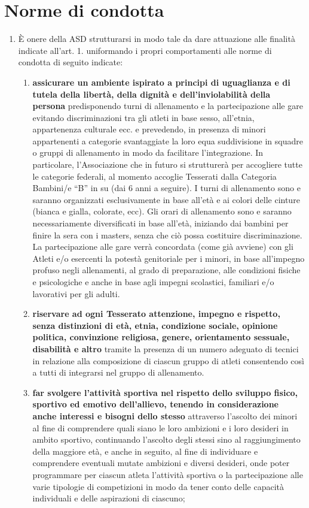 \documentclass{djtsdoc}
\begin{document}
	\section{Norme di condotta}
	\begin{enumerate}
		\item È onere della ASD strutturarsi in modo tale da dare attuazione alle finalità indicate all'art. 1. uniformando i propri comportamenti alle norme di condotta di seguito indicate:
		\begin{enumerate}
			\item \textbf{assicurare un ambiente ispirato a principi di uguaglianza e di tutela della libertà, della dignità e dell'inviolabilità della persona} predisponendo turni di allenamento e la partecipazione alle gare evitando discriminazioni tra gli atleti in base sesso, all'etnia, appartenenza culturale ecc. e prevedendo, in presenza di minori appartenenti a categorie svantaggiate la loro equa suddivisione in squadre o gruppi di allenamento in modo da facilitare l'integrazione. In particolare, l'Associazione che in futuro si strutturerà per accogliere tutte le categorie federali, al momento accoglie Tesserati dalla Categoria Bambini/e “B” in su (dai 6 anni a seguire). I turni di allenamento sono e saranno organizzati esclusivamente in base all'età e ai colori delle cinture (bianca e gialla, colorate, ecc). Gli orari di allenamento sono e saranno necessariamente diversificati in base all'età, iniziando dai bambini per finire la sera con i masters, senza che ciò possa costituire discriminazione. La partecipazione alle gare verrà concordata (come già avviene) con gli Atleti e/o esercenti la potestà genitoriale per i minori, in base all'impegno profuso negli allenamenti, al grado di preparazione, alle condizioni fisiche e psicologiche e anche in base agli impegni scolastici, familiari e/o lavorativi per gli adulti. 
			\item \textbf{riservare ad ogni Tesserato attenzione, impegno e rispetto, senza distinzioni di età, etnia, condizione sociale, opinione politica, convinzione religiosa, genere, orientamento sessuale, disabilità e altro} tramite la presenza di un numero adeguato di tecnici in relazione alla composizione di ciascun gruppo di atleti consentendo così a tutti di integrarsi nel gruppo di allenamento.
			\item \textbf{far svolgere l'attività sportiva nel rispetto dello sviluppo fisico, sportivo ed emotivo dell'allievo, tenendo in considerazione anche interessi e bisogni dello stesso} attraverso l'ascolto dei minori al fine di comprendere quali siano le loro ambizioni e i loro desideri in ambito sportivo, continuando l'ascolto degli stessi sino al raggiungimento della maggiore età, e anche in seguito, al fine di individuare e comprendere eventuali mutate ambizioni e diversi desideri, onde poter programmare per ciascun atleta l'attività sportiva o la partecipazione alle varie tipologie di competizioni in modo da tener conto delle capacità individuali e delle aspirazioni di ciascuno;

\end{enumerate}
\end{enumerate}
\end{document}
